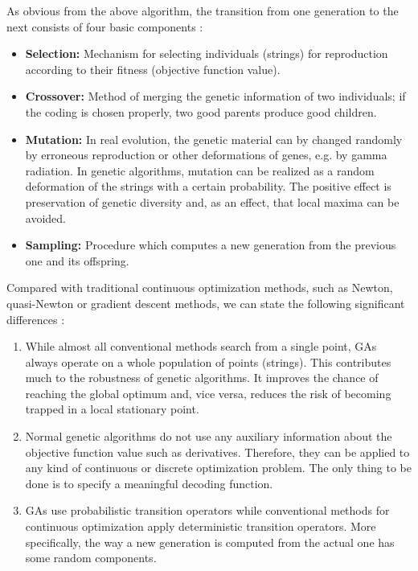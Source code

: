\documentclass[preprint,12pt]{elsarticle}
\begin{document}
As obvious from the above algorithm, the transition from one generation to the next consists of four basic components \cite{mitchell1998introduction}:

\begin{itemize}
    \item \textbf{Selection:} Mechanism for selecting individuals (strings) for reproduction according to their fitness (objective function value).
    \item \textbf{Crossover:} Method of merging the genetic information of two individuals; if the coding is chosen properly, two good parents produce good children.
    \item \textbf{Mutation:} In real evolution, the genetic material can by changed randomly by erroneous reproduction or other deformations of genes, e.g. by gamma radiation. In genetic algorithms, mutation can be realized as a random deformation of the strings with a certain probability. The positive effect is preservation of genetic diversity and, as an effect, that local maxima can be avoided.
    \item \textbf{Sampling:} Procedure which computes a new generation from the previous one and its offspring.
\end{itemize}

Compared with traditional continuous optimization methods, such as Newton, quasi-Newton or gradient descent methods, we can state the following significant differences \cite{fletcher2013practical}:

\begin{enumerate}
    \item While almost all conventional methods search from a single point, GAs always operate on a whole population of points (strings). This contributes much to the robustness of genetic algorithms. It improves the chance of reaching the global optimum and, vice versa, reduces the risk of becoming trapped in a local stationary point.
    \item Normal genetic algorithms do not use any auxiliary information about the objective function value such as derivatives. Therefore, they can be applied to any kind of continuous or discrete optimization problem. The only thing to be done is to specify a meaningful decoding function. 
    \item GAs use probabilistic transition operators while conventional methods for continuous optimization apply deterministic transition operators. More specifically, the way a new generation is computed from the actual one has some random components.
\end{enumerate}
\end{document}
